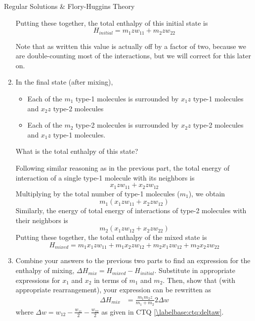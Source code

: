 \begin{activity}{Regular Solutions \& Flory-Huggins Theory}
\begin{exercises}
\begin{enumerate}
\begin{solution}{}
			Putting these together, the total enthalpy of this initial state is
			\begin{equation*}
			H_{initial} = m_1 z w_{11} + m_2 z w_{22}
			\end{equation*}
			
			Note that as written this value is actually off by a factor of two, because we are double-counting most of the interactions, but we will correct for this later on.
			
		\end{solution}

	\item In the final state (after mixing),
	
		\begin{itemize}[topsep=3pt,itemsep=0pt]
			\item Each of the $m_1$ type-1 molecules is surrounded by $x_1 z$ type-1 molecules and $x_2 z$ type-2 molecules
			\item Each of the $m_2$ type-2 molecules is surrounded by $x_2 z$ type-2 molecules and $x_1 z$ type-1 molecules.
		\end{itemize}
		What is the total enthalpy of this state?
		
		\begin{solution}{}
			Following similar reasoning as in the previous part, the total energy of interaction of a single type-1 molecule with its neighbors is
			\begin{equation*}
				x_1 z w_{11} + x_2 z w_{12}
			\end{equation*}
			Multiplying by the total number of type-1 molecules ($m_1$), we obtain
			\begin{equation*}
				m_1(x_1 z w_{11} + x_2 z w_{12})
			\end{equation*}
			Similarly, the energy of total energy of interactions of type-2 molecules with their neighbors is
			\begin{equation*}
				m_2(x_1 z w_{12} + x_2 z w_{22})
			\end{equation*}
			Putting these together, the total enthalpy of the mixed state is
			\begin{equation*}
				H_{mixed} = m_1 x_1 z w_{11} + m_1 x_2 z w_{12} + m_2 x_1 z w_{12} + m_2 x_2 z w_{22}
			\end{equation*}
		\end{solution}
		
	\item Combine your answers to the previous two parts to find an expression for the enthalpy of mixing, $\Delta H_{mix} = H_{mixed} - H_{initial}$.  Substitute in appropriate expressions for $x_1$ and $x_2$ in terms of $m_1$ and $m_2$.  Then, show that (with appropriate rearrangement), your expression can be rewritten as
			\begin{align*}
				\Delta H_{mix} &= \frac{m_1 m_2 z}{m_1+m_2} 2\Delta w
			\end{align*}
			where $\Delta w = w_{12}-\frac{w_{11}}{2} - \frac{w_{22}}{2}$ as given in CTQ \ref{\labelbase:ctq:deltaw}.
	

\end{enumerate}
\end{exercises}
\end{activity}
